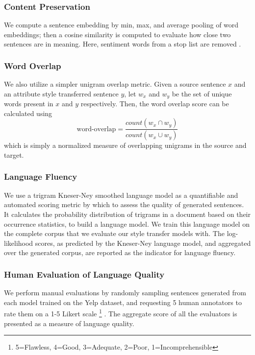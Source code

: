 \documentclass[11pt,a4paper]{article}
\begin{document}
\subsubsection{Content Preservation}
We compute a sentence embedding by min, max, and average pooling of word embeddings; then a cosine similarity is computed to evaluate how close two sentences are in meaning. Here, sentiment words from a stop list \cite{hu2004mining} are removed \cite{fu2017style}.

\subsubsection{Word Overlap}
We also utilize a simpler unigram overlap metric. Given a source sentence $x$ and an attribute style transferred sentence $y$, let $w_x$ and $w_y$ be the set of unique words present in $x$ and $y$ respectively. Then, the word overlap score can be calculated using $$\text{word-overlap} = \frac{count(w_x \cap w_y)}{count(w_x \cup w_y)}$$ which is simply a normalized measure of overlapping unigrams in the source and target.

\subsubsection{Language Fluency}
We use a trigram Kneser-Ney smoothed language model \citep{kneser1995improved} as a quantifiable and automated scoring metric by which to assess the quality of generated sentences. It calculates the probability distribution of trigrams in a document based on their occurrence statistics, to build a language model. We train this language model on the complete corpus that we evaluate our style transfer models with. The log-likelihood scores, as predicted by the Kneser-Ney language model, and aggregated over the generated corpus, are reported as the indicator for language fluency.

\subsubsection{Human Evaluation of Language Quality}
We perform manual evaluations by randomly sampling sentences generated from each model trained on the Yelp dataset, and requesting 5 human annotators to rate them on a 1-5 Likert scale \footnote{5=Flawless, 4=Good, 3=Adequate, 2=Poor, 1=Incomprehensible} \citep{stent2005evaluating}. The aggregate score of all the evaluators is presented as a measure of language quality.
\end{document}
